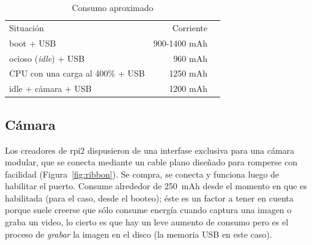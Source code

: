 \documentclass[10pt,a4paper]{article}
\begin{document}
\begin{table}[h!]
    \begin{center}
        \begin{tabular}{lll}
        \cline{1-2}
        \multicolumn{1}{|l|}{\cellcolor[HTML]{EFEFEF}Situaci\'on}   & \multicolumn{1}{r|}{\cellcolor[HTML]{EFEFEF}Corriente}    & \\
        \cline{1-2}
        \multicolumn{1}{|l|}{boot + USB}                            & \multicolumn{1}{r|}{900-1400 mAh}                         & \\
        \cline{1-2}
        \multicolumn{1}{|l|}{ocioso (\emph{idle}) + USB}            & \multicolumn{1}{r|}{960 mAh}                              & \\
        \cline{1-2}
        \multicolumn{1}{|l|}{CPU con una carga al 400\% + USB}      & \multicolumn{1}{r|}{1250 mAh}                             & \\
        \cline{1-2}
        \multicolumn{1}{|l|}{idle + c\'amara + USB}                 & \multicolumn{1}{r|}{1200 mAh}                             &
        \end{tabular}
    \end{center}
    \caption{Consumo aproximado}
    \label{tab:energia}
\end{table}

\subsection{C\'amara}

Los creadores de rpi2 dispusieron de una interfase exclusiva para una c\'amara modular, que se conecta mediante un cable plano dise\~nado para romperse con facilidad (Figura~\ref{fig:ribbon}). Se compra, se conecta y funciona luego de habilitar el puerto. Consume alrededor de \SI{250}{mAh} desde el momento en que es habilitada (para el caso, desde el booteo); \'este es un factor a tener en cuenta porque suele creerse que s\'olo consume energ\'ia cuando captura una imagen o graba un video, lo cierto es que hay un leve aumento de consumo pero es el proceso de \emph{grabar} la imagen en el disco (la memoria USB en este caso).
\end{document}
